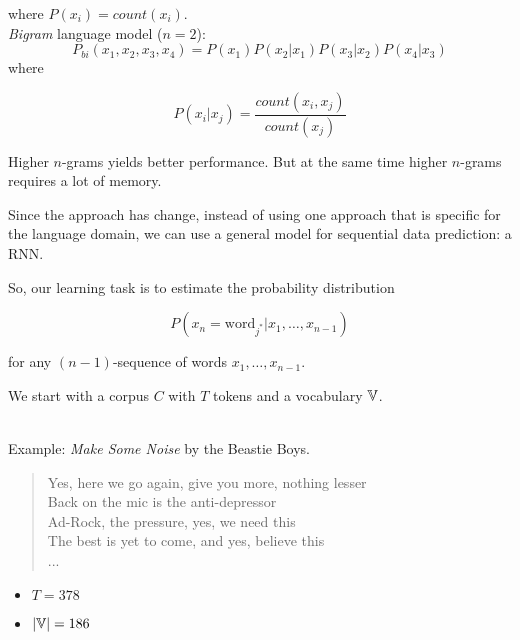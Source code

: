 where $P(x_i) = count(x_i)$.\\

\textit{Bigram} language model ($n=2$): 
\begin{equation}
P_{bi}(x_1,x_2,x_3,x_4) = P(x_1)P(x_2\vert x_1)P(x_3\vert x_2)P(x_4\vert x_3)
\end{equation} 
where

\begin{equation}
P(x_i\vert x_j) = \frac{count(x_i, x_j)}{count(x_j)}
\end{equation} 


Higher $n$-grams yields better performance. But at the same time higher $n$-grams requires a lot of memory\cite{Heafield}.

Since \cite{Mikolov11} the approach has change, instead of using one approach that is specific for the language domain, we can use a general model for sequential data prediction: a RNN.

So, our learning task is to estimate the probability distribution 

\[
P(x_{n} = \text{word}_{j^{*}} | x_{1}, \dots ,x_{n-1})
\]

for any $(n-1)$-sequence of words $x_{1}, \dots ,x_{n-1}$.

We start with a corpus $C$ with $T$ tokens and a vocabulary $\mathbb{V}$.\\\

Example: \textit{Make Some Noise} by the Beastie Boys.\\

\begin{quote}
Yes, here we go again, give you more, nothing lesser\\
Back on the mic is the anti-depressor\\
Ad-Rock, the pressure, yes, we need this\\
The best is yet to come, and yes, believe this\\
... \\
\end{quote}

\begin{itemize}
\item $T = 378$
\item $|\mathbb{V}| = 186$
\end{itemize}


